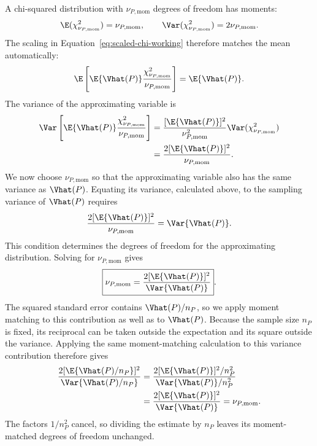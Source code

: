 A chi-squared distribution with \(\nu_{P,\mathrm{mom}}\) degrees of freedom
has moments:
\begin{equation}
  \E(\chi^2_{\nu_{P,\mathrm{mom}}})=\nu_{P,\mathrm{mom}},
  \qquad
  \Var(\chi^2_{\nu_{P,\mathrm{mom}}})=2\nu_{P,\mathrm{mom}}.
\end{equation}
The scaling in Equation~\eqref{eq:scaled-chi-working} therefore matches the
mean automatically:
\begin{equation}
  \E\left[
  \E\{\Vhat(P)\}\frac{\chi^2_{\nu_{P,\mathrm{mom}}}}{\nu_{P,\mathrm{mom}}}
  \right]
  =\E\{\Vhat(P)\}.
\end{equation}
The variance of the approximating variable is
\begin{align}
  \Var\left[
  \E\{\Vhat(P)\}\frac{\chi^2_{\nu_{P,\mathrm{mom}}}}{\nu_{P,\mathrm{mom}}}
  \right]
  &=
  \frac{[\E\{\Vhat(P)\}]^2}{\nu_{P,\mathrm{mom}}^2}
  \Var(\chi^2_{\nu_{P,\mathrm{mom}}})\\
  &=
  \frac{2[\E\{\Vhat(P)\}]^2}{\nu_{P,\mathrm{mom}}}.
\end{align}
We now choose \(\nu_{P,\mathrm{mom}}\) so that the approximating variable
also has the same variance as \(\Vhat(P)\). Equating its variance,
calculated above, to the sampling variance of \(\Vhat(P)\) requires
\begin{equation*}
  \frac{2[\E\{\Vhat(P)\}]^2}{\nu_{P,\mathrm{mom}}}
  =\Var\{\Vhat(P)\}.
\end{equation*}
This condition determines the degrees of freedom for the approximating
distribution. Solving for \(\nu_{P,\mathrm{mom}}\) gives
\begin{equation}
  \boxed{
  \nu_{P,\mathrm{mom}}
  =
  \frac{2[\E\{\Vhat(P)\}]^2}
       {\Var\{\Vhat(P)\}}
  }.
  \label{eq:component-df-moments}
\end{equation}
The squared standard error contains \(\Vhat(P)/n_P\), so we apply
moment matching to this contribution as well as to \(\Vhat(P)\).
Because the sample size \(n_P\) is fixed, its reciprocal can be taken
outside the expectation and its square outside the variance.
Applying the same moment-matching calculation to this variance contribution
therefore gives
\begin{align*}
  \frac{2[\E\{\Vhat(P)/n_P\}]^2}
       {\Var\{\Vhat(P)/n_P\}}
  &=\frac{2[\E\{\Vhat(P)\}]^2/n_P^2}
          {\Var\{\Vhat(P)\}/n_P^2}\\
  &=\frac{2[\E\{\Vhat(P)\}]^2}
          {\Var\{\Vhat(P)\}}
   =\nu_{P,\mathrm{mom}}.
\end{align*}
The factors \(1/n_P^2\) cancel, so dividing the estimate by \(n_P\)
leaves its moment-matched degrees of freedom unchanged.

